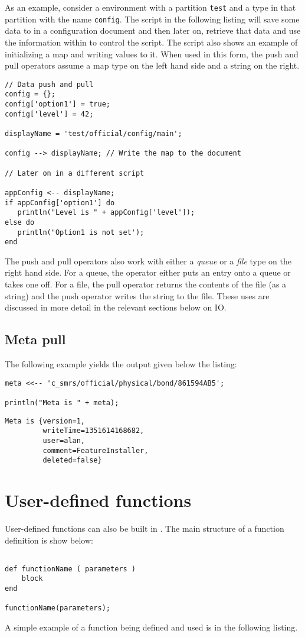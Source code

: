 As an example, consider a \Rapture environment with a partition \Verb+test+ and a type in that partition with the name \verb+config+. The script in the following listing will save some data to \Rapture in a configuration document and then later on, retrieve that data and use the information within to control the script. The script also shows an example of initializing a map and writing values to it. When used in this form, the push and pull operators assume a map type on the left hand side and a string on the right.

\begin{lstlisting}[caption={Push and Pull}]
// Data push and pull
config = {};
config['option1'] = true;
config['level'] = 42;

displayName = 'test/official/config/main';

config --> displayName; // Write the map to the document

// Later on in a different script

appConfig <-- displayName;
if appConfig['option1'] do
   println("Level is " + appConfig['level']);
else do
   println("Option1 is not set');
end
\end{lstlisting}

The push and pull operators also work with either a \emph{queue} or a \emph{file} type on the right hand side. For a queue, the operator either puts an entry onto a \Rapture queue or takes one off. For a file, the pull operator returns the contents of the file (as a string) and the push operator writes the string to the file. These uses are discussed in more detail in the relevant sections below on IO.

\section{Meta pull}

The following example yields the output given below the listing:
\begin{lstlisting}[caption={Meta pull}]
meta <<-- 'c_smrs/official/physical/bond/861594AB5';

println("Meta is " + meta);
\end{lstlisting}

\begin{Verbatim}
Meta is {version=1,
         writeTime=1351614168682,
         user=alan,
         comment=FeatureInstaller,
         deleted=false}
\end{Verbatim}


\chapter{User-defined functions}
User-defined functions  can also be built in \Reflex. The main structure of a function definition is show below:
\begin{Verbatim}

def functionName ( parameters )
    block
end

functionName(parameters);

\end{Verbatim}
A simple example of a function being defined and used is in the following listing.

